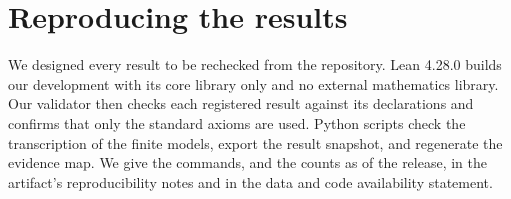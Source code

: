 \section{Reproducing the results}
\label{app:repro}

We designed every result to be rechecked from the repository. Lean 4.28.0
builds our development with its core library only and no external mathematics
library. Our validator then checks each registered result against its
declarations and confirms that only the standard axioms are used. Python
scripts check the transcription of the finite models, export the result
snapshot, and regenerate the evidence map. We give the commands, and the counts as of the release, in the artifact's reproducibility notes and in the data and
code availability statement.
